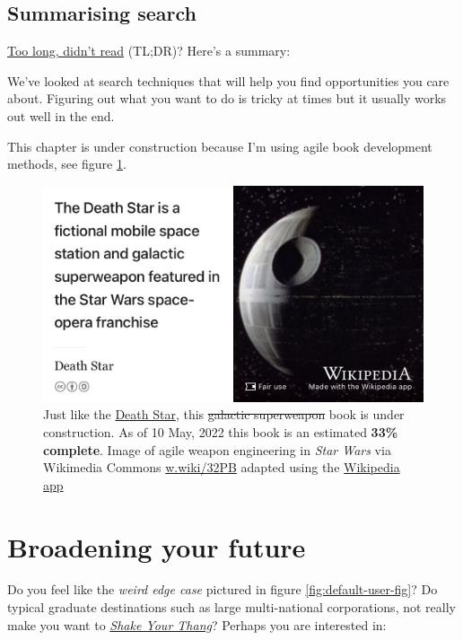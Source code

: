 \documentclass[
]{book}
\begin{document}
\hypertarget{tldr8}{%
\section{Summarising search}\label{tldr8}}

\href{https://en.wiktionary.org/wiki/too_long;_didn\%27t_read}{Too long, didn't read} (TL;DR)? Here's a summary:

We've looked at search techniques that will help you find opportunities you care about. Figuring out what you want to do is tricky at times but it usually works out well in the end.

This chapter is under construction because I'm using agile book development methods, see figure \ref{fig:deathstar5-fig}.

\begin{figure}

{\centering \includegraphics[width=0.99\linewidth]{images/DeathStar2} 

}

\caption{Just like the \href{https://en.wikipedia.org/wiki/Death_Star}{Death Star}, this \sout{galactic superweapon} book is under construction. As of 10 May, 2022 this book is an estimated \textbf{33\% complete}. Image of agile weapon engineering in \emph{Star Wars} via Wikimedia Commons \href{https://w.wiki/32PB}{w.wiki/32PB} adapted using the \href{https://apps.apple.com/gb/app/wikipedia/id324715238}{Wikipedia app}}\label{fig:deathstar5-fig}
\end{figure}

\hypertarget{broadening}{%
\chapter{Broadening your future}\label{broadening}}

Do you feel like the \emph{weird edge case} pictured in figure \ref{fig:default-user-fig}? Do typical graduate destinations such as large multi-national corporations, not really make you want to \emph{\href{https://en.wikipedia.org/wiki/Shake_Your_Thang}{Shake Your Thang}}? \citep{saltnpepa} Perhaps you are interested in:
\end{document}
